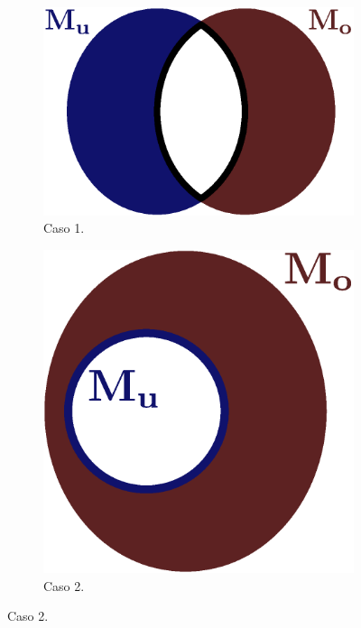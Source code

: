 \begin{figure}[ht]
\centering
\begin{subfigure}{.42\textwidth}
  \centering
  \includegraphics[width=.9\linewidth]{chapters/cap-musicalidade/musicalidade-it1.eps}  
  \caption{Caso 1.}
  \label{fig:ex:infomutua:a}
\end{subfigure}
\hfill	
\begin{subfigure}{.28\textwidth}
  \centering
  \includegraphics[width=.9\linewidth]{chapters/cap-musicalidade/musicalidade-it2.eps}  
  \caption{Caso 2.}
  \label{fig:ex:infomutua:b}
\end{subfigure}
\hfill

\end{figure}
